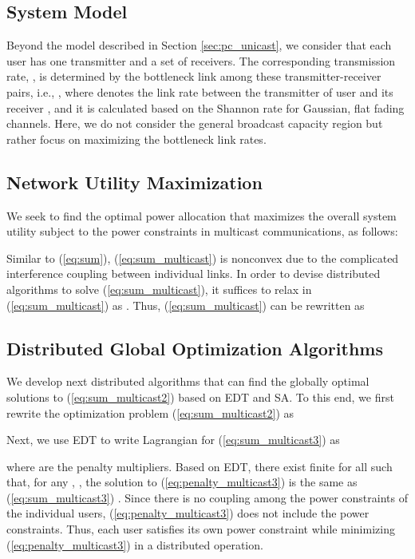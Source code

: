 \documentclass[10pt,journal,letterpaper,compsoc]{IEEEtran}
\begin{document}
{{\subsection{System Model}
Beyond the model described in Section \ref{sec:pc_unicast}, we consider that each user  has one transmitter and a set  of receivers. The corresponding transmission rate, , is determined by the bottleneck link among these transmitter-receiver pairs, i.e., , where  denotes the link rate between the transmitter of user  and its receiver , and it is calculated based on the Shannon rate  for Gaussian, flat fading channels. Here, we do not consider the general broadcast capacity region but rather focus on maximizing the bottleneck link rates.

\subsection{Network Utility Maximization}
We seek to find the optimal power allocation  that maximizes the overall system utility subject to the power constraints in multicast communications, as follows:


Similar to (\ref{eq:sum}), (\ref{eq:sum_multicast}) is nonconvex due to the complicated interference coupling between individual links. In order to devise distributed algorithms to solve (\ref{eq:sum_multicast}), it suffices to relax  in (\ref{eq:sum_multicast}) as . Thus, (\ref{eq:sum_multicast}) can be rewritten as


\subsection{Distributed Global Optimization Algorithms}

We develop next distributed algorithms that can find the globally optimal solutions to (\ref{eq:sum_multicast2}) based on EDT and SA. To this end, we first rewrite the optimization problem (\ref{eq:sum_multicast2}) as


Next, we use EDT to write Lagrangian for (\ref{eq:sum_multicast3}) as

where  are the penalty multipliers. Based on EDT, there exist finite  for all  such that, for any , , the solution to (\ref{eq:penalty_multicast3}) is the same as (\ref{eq:sum_multicast3}) \cite{chen:2008}. Since there is no coupling among the power constraints of the individual users, (\ref{eq:penalty_multicast3}) does not include the power constraints. Thus, each user satisfies its own power constraint while minimizing (\ref{eq:penalty_multicast3}) in a distributed operation.

}}
\end{document}
